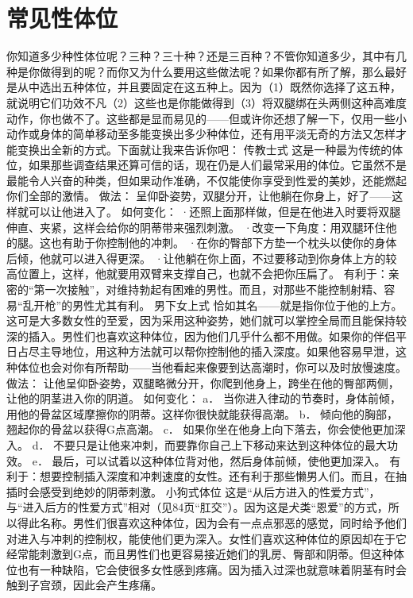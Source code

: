 \documentclass[12pt,UTF8,openany]{ctexbook}
\begin{document}
\section{常见性体位}
你知道多少种性体位呢？三种？三十种？还是三百种？不管你知道多少，其中有几种是你做得到的呢？而你又为什么要用这些做法呢？如果你都有所了解，那么最好是从中选出五种体位，并且要固定在这五种上。因为（1）既然你选择了这五种，就说明它们功效不凡（2）这些也是你能做得到（3）将双腿绑在头两侧这种高难度动作，你也做不了。这些都是显而易见的——但或许你还想了解一下，仅用一些小动作或身体的简单移动至多能变换出多少种体位，还有用平淡无奇的方法又怎样才能变换出全新的方式。下面就让我来告诉你吧：
传教士式
这是一种最为传统的体位，如果那些调查结果还算可信的话，现在仍是人们最常采用的体位。它虽然不是最能令人兴奋的种类，但如果动作准确，不仅能使你享受到性爱的美妙，还能燃起你们全部的激情。
做法：
呈仰卧姿势，双腿分开，让他躺在你身上，好了——这样就可以让他进入了。
如何变化：
·还照上面那样做，但是在他进入时要将双腿伸直、夹紧，这样会给你的阴蒂带来强烈刺激。
·改变一下角度：用双腿环住他的腿。这也有助于你控制他的冲刺。
·在你的臀部下方垫一个枕头以使你的身体后倾，他就可以进入得更深。
·让他躺在你上面，不过要移动到你身体上方的较高位置上，这样，他就要用双臂来支撑自己，也就不会把你压扁了。
有利于：亲密的“第一次接触”，对维持勃起有困难的男性。而且，对那些不能控制射精、容易“乱开枪”的男性尤其有利。
男下女上式
恰如其名——就是指你位于他的上方。这可是大多数女性的至爱，因为采用这种姿势，她们就可以掌控全局而且能保持较深的插入。男性们也喜欢这种体位，因为他们几乎什么都不用做。如果你的伴侣平日占尽主导地位，用这种方法就可以帮你控制他的插入深度。如果他容易早泄，这种体位也会对你有所帮助——当他看起来像要到达高潮时，你可以及时放慢速度。
做法：
让他呈仰卧姿势，双腿略微分开，你爬到他身上，跨坐在他的臀部两侧，让他的阴茎进入你的阴道。
如何变化：
a． 当你进入律动的节奏时，身体前倾，用他的骨盆区域摩擦你的阴蒂。这样你很快就能获得高潮。
b． 倾向他的胸部，翘起你的骨盆以获得G点高潮。
c． 如果你坐在他身上向下落去，你会使他更加深入。
d． 不要只是让他来冲刺，而要靠你自己上下移动来达到这种体位的最大功效。
e． 最后，可以试着以这种体位背对他，然后身体前倾，使他更加深入。
有利于：想要控制插入深度和冲刺速度的女性。还有利于那些懒男人们。而且，在抽插时会感受到绝妙的阴蒂刺激。
小狗式体位
这是“从后方进入的性爱方式”，与“进入后方的性爱方式”相对（见84页“肛交”）。因为这是犬类“恩爱”的方式，所以得此名称。男性们很喜欢这种体位，因为会有一点点邪恶的感觉，同时给予他们对进入与冲刺的控制权，能使他们更为深入。女性们喜欢这种体位的原因却在于它经常能刺激到G点，而且男性们也更容易接近她们的乳房、臀部和阴蒂。但这种体位也有一种缺陷，它会使很多女性感到疼痛。因为插入过深也就意味着阴茎有时会触到子宫颈，因此会产生疼痛。
\end{document}
